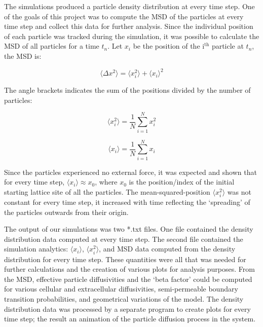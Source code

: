 	The simulations produced a particle density distribution at every time step. One of the goals of this project was to compute the MSD of the particles at every time step and collect this data for further analysis. Since the individual position of each particle was tracked during the simulation, it was possible to calculate the MSD of all particles for a time $ t_n $. Let $ x_i $ be the position of the $ \textrm{i}^\textrm{th} $ particle at $ t_n $, the MSD is:
	
	\begin{equation}
		\langle \Delta x^2 \rangle = \langle x_{i}^2 \rangle + \langle x_i \rangle^2
	\end{equation}
	
	The angle brackets indicates the sum of the positions divided by the number of particles:
	
	\begin{equation}
		\langle x_{i}^2 \rangle = \dfrac{1}{N}\sum_{i=1}^{N} x_{i}^2
	\end{equation}
	
	\begin{equation}
		\langle x_{i} \rangle = \dfrac{1}{N}\sum_{i=1}^{N} x_i
	\end{equation}
	
	Since the particles experienced no external force, it was expected and shown that for every time step, $ \langle x_{i} \rangle \approx x_0 $, where $ x_0 $ is the position/index of the initial starting lattice site of all the particles. The mean-squared-position $ \langle x_{i}^2 \rangle $ was not constant for every time step, it increased with time reflecting the `spreading' of the particles outwards from their origin.
	
%	
%	
%	
%	
	
	The output of our simulations was two *.txt files. One file contained the density distribution data computed at every time step. The second file contained the simulation analytics: $ \langle x_{i} \rangle $, $ \langle x_{i}^2 \rangle $, and MSD data computed from the density distribution for every time step. These quantities were all that was needed for further calculations and the creation of various plots for analysis purposes. From the MSD, effective particle diffusivities and the `beta factor' could be computed for various cellular and extracellular diffusivities, semi-permeable boundary transition probabilities, and geometrical variations of the model. The density distribution data was processed by a separate program to create plots for every time step; the result an animation of the particle diffusion process in the system.
	
